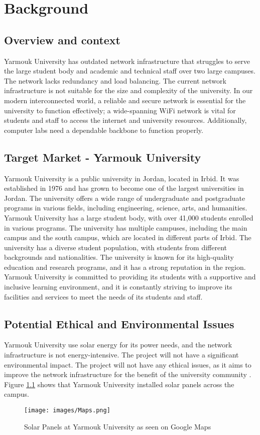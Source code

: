 \documentclass[12pt]{report}
\begin{document}

\chapter{Background}
\section{Overview and context}

Yarmouk University has outdated network infrastructure that struggles to serve the large student body and academic and technical staff over two large campuses. The network lacks redundancy and load balancing. The current network infrastructure is not suitable for the size and complexity of the university. In our modern interconnected world, a reliable and secure network is essential for the university to function effectively; a wide-spanning WiFi network is vital for students and staff to access the internet and university resources. Additionally, computer labs need a dependable backbone to function properly.
\section{Target Market - Yarmouk University}
Yarmouk University is a public university in Jordan, located in Irbid. It was established in 1976 and has grown to become one of the largest universities in Jordan. The university offers a wide range of undergraduate and postgraduate programs in various fields, including engineering, science, arts, and humanities. Yarmouk University has a large student body, with over 41,000 students enrolled in various programs. The university has multiple campuses, including the main campus and the south campus, which are located in different parts of Irbid. The university has a diverse student population, with students from different backgrounds and nationalities. The university is known for its high-quality education and research programs, and it has a strong reputation in the region. Yarmouk University is committed to providing its students with a supportive and inclusive learning environment, and it is constantly striving to improve its facilities and services to meet the needs of its students and staff. \cite{YU}

\section{Potential Ethical and Environmental Issues}
Yarmouk University use solar energy for its power needs, and the network infrastructure is not energy-intensive. The project will not have a significant environmental impact. The project will not have any ethical issues, as it aims to improve the network infrastructure for the benefit of the university community \cite{Solar}. Figure \ref{fig:YUMap} shows that Yarmouk University installed solar panels across the campus. 
\begin{figure}
    \centering
    \texttt{[image: images/Maps.png]}
    \caption{Solar Panels at Yarmouk University as seen on Google Maps}
    \label{fig:YUMap}
\end{figure}
\end{document}
